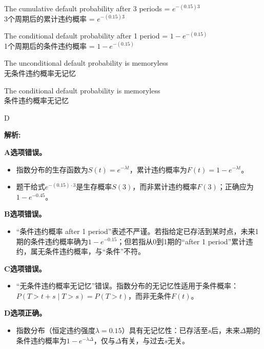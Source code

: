 \documentclass{article}
\newenvironment{explanation}
{\textbf{解析:}\par}
{\par}
\begin{document}
\begin{choices}
    \item The cumulative default probability after 3 periods = $e^{-(0.15)3}$\\
    3个周期后的累计违约概率 = $e^{-(0.15)3}$
    \item The conditional default probability after 1 period = $1 - e^{-(0.15)}$\\
    1个周期后的条件违约概率 = $1 - e^{-(0.15)}$
    \item The unconditional default probability is memoryless\\
    无条件违约概率无记忆
    \item The conditional default probability is memoryless\\
    条件违约概率无记忆
\end{choices}

\begin{correctanswer}
    D
\end{correctanswer}

\begin{explanation}
    \textbf{A选项错误。}
    \begin{itemize}
        \item 指数分布的生存函数为$S(t)=e^{-\lambda t}$，累计违约概率为$F(t)=1-e^{-\lambda t}$。
        \item 题干给式$e^{-(0.15)\cdot 3}$是生存概率$S(3)$，而非累计违约概率$F(3)$；正确应为$1-e^{-0.45}$。
    \end{itemize}

    \textbf{B选项错误。}
    \begin{itemize}
        \item “条件违约概率 after 1 period”表述不严谨。若指给定已存活到某时点，未来1期的条件违约概率确为$1-e^{-0.15}$；但若指从0到1期的“after 1 period”累计违约，属无条件违约概率，与“条件”不符。
    \end{itemize}

    \textbf{C选项错误。}
    \begin{itemize}
        \item “无条件违约概率无记忆”错误。指数分布的无记忆性适用于条件概率：$P(T>t+s\mid T>s)=P(T>t)$，而非无条件$F(t)$。
    \end{itemize}

    \textbf{D选项正确。}
    \begin{itemize}
        \item 指数分布（恒定违约强度$\lambda=0.15$）具有无记忆性：已存活至$s$后，未来$\Delta$期的条件违约概率为$1-e^{-\lambda \Delta}$，仅与$\Delta$有关，与过去$s$无关。
    \end{itemize}
\end{explanation}
\end{document}
